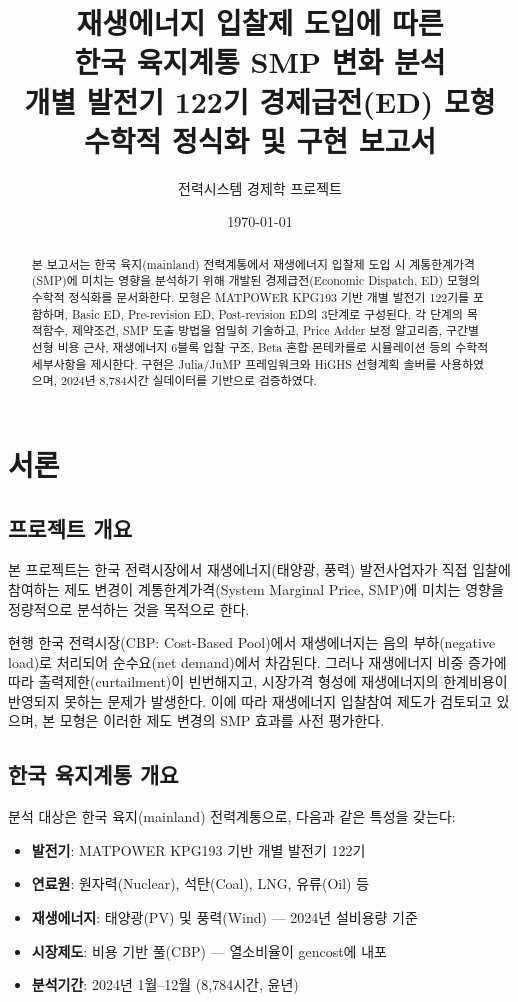 \documentclass[11pt, a4paper]{article}
\title{
    \vspace{-2cm}
    \textbf{재생에너지 입찰제 도입에 따른 \\
    한국 육지계통 SMP 변화 분석} \\[0.5cm]
    \large 개별 발전기 122기 경제급전(ED) 모형 \\
    수학적 정식화 및 구현 보고서
}
\author{
    전력시스템 경제학 프로젝트
}
\date{\today}
\begin{document}
\maketitle
\thispagestyle{empty}

\begin{abstract}
본 보고서는 한국 육지(mainland) 전력계통에서 재생에너지 입찰제 도입 시
계통한계가격(SMP)에 미치는 영향을 분석하기 위해 개발된 경제급전(Economic Dispatch, ED)
모형의 수학적 정식화를 문서화한다.
모형은 MATPOWER KPG193 기반 개별 발전기 122기를 포함하며,
Basic ED, Pre-revision ED, Post-revision ED의 3단계로 구성된다.
각 단계의 목적함수, 제약조건, SMP 도출 방법을 엄밀히 기술하고,
Price Adder 보정 알고리즘, 구간별 선형 비용 근사, 재생에너지 6블록 입찰 구조,
Beta 혼합 몬테카를로 시뮬레이션 등의 수학적 세부사항을 제시한다.
구현은 Julia/JuMP 프레임워크와 HiGHS 선형계획 솔버를 사용하였으며,
2024년 8,784시간 실데이터를 기반으로 검증하였다.
\end{abstract}

\tableofcontents
\newpage

\section{서론}\label{sec:intro}

\subsection{프로젝트 개요}

본 프로젝트는 한국 전력시장에서 재생에너지(태양광, 풍력) 발전사업자가
직접 입찰에 참여하는 제도 변경이 계통한계가격(System Marginal Price, SMP)에
미치는 영향을 정량적으로 분석하는 것을 목적으로 한다.

현행 한국 전력시장(CBP: Cost-Based Pool)에서 재생에너지는
음의 부하(negative load)로 처리되어 순수요(net demand)에서 차감된다.
그러나 재생에너지 비중 증가에 따라 출력제한(curtailment)이 빈번해지고,
시장가격 형성에 재생에너지의 한계비용이 반영되지 못하는 문제가 발생한다.
이에 따라 재생에너지 입찰참여 제도가 검토되고 있으며,
본 모형은 이러한 제도 변경의 SMP 효과를 사전 평가한다.

\subsection{한국 육지계통 개요}

분석 대상은 한국 육지(mainland) 전력계통으로, 다음과 같은 특성을 갖는다:
\begin{itemize}[noitemsep]
    \item \textbf{발전기}: MATPOWER KPG193 기반 개별 발전기 122기
    \item \textbf{연료원}: 원자력(Nuclear), 석탄(Coal), LNG, 유류(Oil) 등
    \item \textbf{재생에너지}: 태양광(PV) 및 풍력(Wind) --- 2024년 설비용량 기준
    \item \textbf{시장제도}: 비용 기반 풀(CBP) --- 열소비율이 gencost에 내포
    \item \textbf{분석기간}: 2024년 1월--12월 (8,784시간, 윤년)
\end{itemize}
\end{document}
